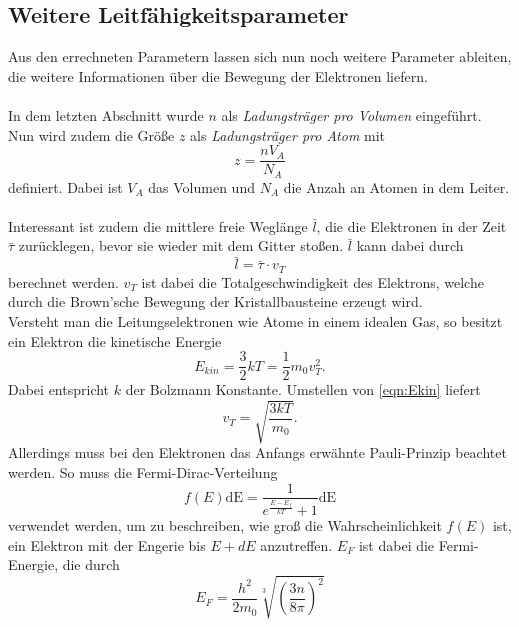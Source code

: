 \subsection{Weitere Leitfähigkeitsparameter}
Aus den errechneten Parametern lassen sich nun noch weitere Parameter ableiten, die weitere Informationen 
über die Bewegung der Elektronen liefern.\\\\
In dem letzten Abschnitt wurde $n$ als \textit{Ladungsträger pro Volumen} eingeführt. Nun wird zudem die 
Größe $z$ als \textit{Ladungsträger pro Atom} mit 
\begin{equation}
    z=\frac{n V_A}{N_A}\label{eqn:z}
\end{equation}
definiert. Dabei ist $V_A$ das Volumen und $N_A$ die Anzah an Atomen in dem Leiter.\\\\
Interessant ist zudem die mittlere freie Weglänge $\bar{l}$, die die Elektronen in der Zeit $\bar{\tau}$ zurücklegen, bevor
sie wieder mit dem Gitter stoßen. $\bar{l}$ kann dabei durch
\begin{equation*}
    \bar{l}=\bar{\tau}\cdot v_T
\end{equation*}
berechnet werden. $v_T$ ist dabei die Totalgeschwindigkeit des Elektrons, welche durch die Brown'sche Bewegung 
der Kristallbausteine erzeugt wird.\\
Versteht man die Leitungselektronen wie Atome in einem idealen Gas, so besitzt ein Elektron die kinetische Energie
\begin{equation}
    E_{kin}=\frac{3}{2}kT=\frac{1}{2}m_0v_T^2 . \label{eqn:Ekin}
\end{equation}
Dabei entspricht $k$ der Bolzmann Konstante. Umstellen von \eqref{eqn:Ekin} liefert
\begin{equation}
    v_T=\sqrt{\frac{3kT}{m_0}}. \label{eqn:vT1}
\end{equation}
Allerdings muss bei den Elektronen das Anfangs erwähnte Pauli-Prinzip beachtet werden. So muss die Fermi-Dirac-Verteilung
\begin{equation*}
    f(E)\text{dE}=\frac{1}{e^{\frac{E-E_f}{kT}}+1}\text{dE}
\end{equation*}
verwendet werden, um zu beschreiben, wie groß die Wahrscheinlichkeit $f(E)$ ist, ein 
Elektron mit der Engerie bis $E+dE$ anzutreffen. $E_F$ ist dabei die Fermi-Energie, die durch
\begin{equation}
    E_F=\frac{h^2}{2m_0}\sqrt[3]{\left(\frac{3n}{8\pi}\right)^2} \label{eqn:EF}
\end{equation}
